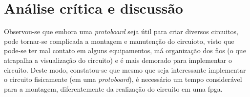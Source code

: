 \chapter{Análise crítica e discussão}
	Observou-se que embora uma \textit{protoboard} seja útil para criar diversos circuitos,
	pode tornar-se complicada a montagem e manutenção do circuioto, visto que pode-se ter
	mal contato em alguns equipamentos, má organização dos fios (o que atrapalha a visualização
	do circuito) e é mais demorado para implementar o circuito.
	Deste modo, constatou-se que mesmo que seja interessante implementar o circuito fisicamente
	 (em uma \textit{protoboard}), é necessário um tempo considerável para a montagem, diferentemente
	da realização do circuito em uma \ac{fpga}.

